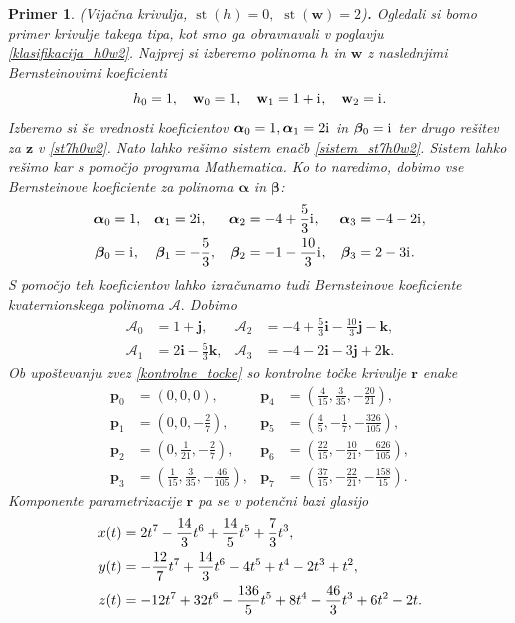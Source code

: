 \documentclass[12pt,a4paper,twoside]{article}
\newcommand{\iu}{\mathrm{i}\mkern1mu} %
\theoremstyle{definition} %
\theoremstyle{plain} %
\theoremstyle{primerstyle}
\newtheorem{primer}[definicija]{Primer}
\numberwithin{equation}{section}  %
\newcommand{\pV}{\mathbf{p}}
\newcommand{\rV}{\mathbf{r}}
\newcommand{\iV}{\mathbf{i}}
\newcommand{\jV}{\mathbf{j}}
\newcommand{\kV}{\mathbf{k}}
\newcommand{\wV}{\mathbf{w}}
\newcommand{\zV}{\mathbf{z}}
\newcommand{\AQ}{\mathcal{A}}
\newcommand{\balpha}{\boldsymbol \alpha}
\newcommand{\bbeta}{\boldsymbol \beta}
\DeclareMathOperator{\st}{st}
\begin{document}
\begin{primer}
	\label{primer_h0w2_vijacna}
	\textnormal{ }(Vijačna krivulja, $\st(h)=0,$ $\st(\wV)=2$)\textbf{.}
	Ogledali si bomo primer krivulje takega tipa, kot smo ga obravnavali v poglavju \ref{klasifikacija_h0w2}. Najprej si izberemo polinoma $h$ in $\wV$ z naslednjimi Bernsteinovimi koeficienti
	$$h_0=1,\quad\wV_0=1,\quad\wV_1=1+\iu,\quad\wV_2=\iu.$$
	Izberemo si še vrednosti koeficientov $\balpha_0=1,\balpha_1=2\iu$ in $\bbeta_0=\iu$ ter drugo rešitev za $\zV$ v \eqref{st7h0w2}. Nato lahko rešimo sistem enačb \eqref{sistem_st7h0w2}. Sistem lahko rešimo kar s pomočjo programa \emph{Mathematica}. Ko to naredimo, dobimo vse Bernsteinove koeficiente za polinoma $\balpha$ in $\bbeta$:
	\begin{align*}
		\balpha_0&=1,&\balpha_1&=2\iu,&\balpha_2&=-4+\frac{5}{3}\iu,&\balpha_3&=-4-2\iu,\\
		\bbeta_0&=\iu,&\bbeta_1&=-\frac{5}{3},&\bbeta_2&=-1-\frac{10}{3}\iu,&\bbeta_3&=2-3\iu.
	\end{align*}
	S pomočjo teh koeficientov lahko izračunamo tudi Bernsteinove koeficiente kvaternionskega polinoma $\AQ.$ Dobimo
	\begin{align*}
		\AQ_0&=1+\jV,&\AQ_2&=-4+\frac{5}{3}\iV-\frac{10}{3}\jV-\kV,\\
		\AQ_1&=2\iV-\frac{5}{3}\kV,&\AQ_3&=-4-2\iV-3\jV+2\kV.
	\end{align*}
	Ob upoštevanju zvez \eqref{kontrolne_tocke} so kontrolne točke krivulje $\rV$ enake
	\begin{align*}
		\pV_0&=(0,0,0),&\pV_4&=\left(\frac{4}{15},\frac{3}{35},-\frac{20}{21}\right),\\
		\pV_1&=\left(0,0,-\frac{2}{7}\right),&\pV_5&=\left(\frac{4}{5},-\frac{1}{7},-\frac{326}{105}\right),\\
		\pV_2&=\left(0,\frac{1}{21},-\frac{2}{7}\right),&\pV_6&=\left(\frac{22}{15},-\frac{10}{21},-\frac{626}{105}\right),\\
		\pV_3&=\left(\frac{1}{15},\frac{3}{35},-\frac{46}{105}\right),&\pV_7&=\left(\frac{37}{15},-\frac{22}{21},-\frac{158}{15}\right).
	\end{align*}
	Komponente parametrizacije $\rV$ pa se v potenčni bazi glasijo
	\begin{align}
		x(t)&=2t^7-\frac{14}{3}t^6+\frac{14}{5}t^5+\frac{7}{3}t^3,\notag\\
		y(t)&=-\frac{12}{7}t^7+\frac{14}{3}t^6-4t^5+t^4-2t^3+t^2,\label{primer_h0w2_vijacna_krivulja}\\
		z(t)&=-12t^7+32t^6-\frac{136}{5}t^5+8t^4-\frac{46}{3}t^3+6t^2-2t.\notag

\end{align}
\end{primer}
\end{document}
